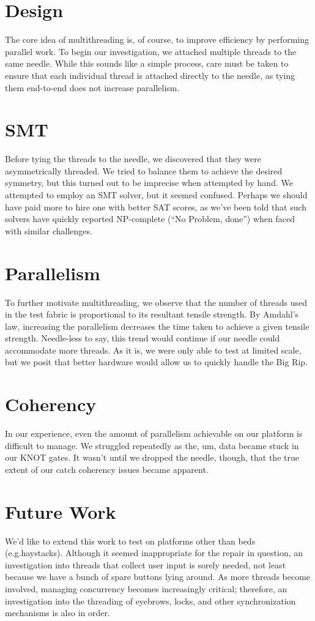 \documentclass[letterpaper,12pt]{article}
\begin{document}
\begin{multicols}{2}
\section{Design}
The core idea of multithreading is, of course, to improve efficiency by performing parallel work.
To begin our investigation, we attached multiple threads to the same needle.
While this sounds like a simple process, care must be taken to ensure that each individual thread is attached directly to the needle, as tying them end-to-end does not increase parallelism.

\section{SMT}
Before tying the threads to the needle, we discovered that they were asymmetrically threaded.
We tried to balance them to achieve the desired symmetry, but this turned out to be imprecise when attempted by hand.
We attempted to employ an SMT solver, but it seemed confused.
Perhaps we should have paid more to hire one with better SAT scores, as we've been told that such solvers have quickly reported NP-complete (``No Problem, done'') when faced with similar challenges.

\section{Parallelism}
\label{sec:parallelism}
To further motivate multithreading, we observe that the number of threads used in the test fabric is proportional to its resultant tensile strength.
By Amdahl's law, increasing the parallelism decreases the time taken to achieve a given tensile strength.
Needle-less to say, this trend would continue if our needle could accommodate more threads.
As it is, we were only able to test at limited scale, but we posit that better hardware would allow us to quickly handle the Big Rip.

\section{Coherency}
In our experience, even the amount of parallelism achievable on our platform is difficult to manage.
We struggled repeatedly as the, um, data became stuck in our KNOT gates.
It wasn't until we dropped the needle, though, that the true extent of our catch coherency issues became apparent.

\section{Future Work}
We'd like to extend this work to test on platforms other than beds (e.g.\@ haystacks).
Although it seemed inappropriate for the repair in question, an investigation into threads that collect user input is sorely needed, not least because we have a bunch of spare buttons lying around.
As more threads become involved, managing concurrency becomes increasingly critical; therefore, an investigation into the threading of eyebrows, locks, and other synchronization mechanisms is also in order.


\end{multicols}
\end{document}

